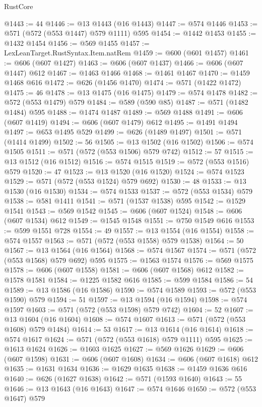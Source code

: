\begin{lexlean}{RustCore}
\begin{coremodule}
@1443 := 44
@1446 := @13 @1443 (@16 @1443)
@1447 := @574 @1446
@1453 := @571 (@572 (@553 @1447) @579 @1111) @595
@1454 := @1442 @1453
@1455 := @1432 @1454
@1456 := @569 @1455
@1457 := LexLeanTarget.RustSyntax.Item.natRem
@1459 := @600 (@601 @1457)
@1461 := @606 (@607 @1427)
@1463 := @606 (@607 @1437)
@1466 := @606 (@607 @1447) @612
@1467 := @1463 @1466
@1468 := @1461 @1467
@1470 := @1459 @1468 @616
@1472 := @626 (@1456 @1470)
@1474 := @571 (@1422 @1472)
@1475 := 46
@1478 := @13 @1475 (@16 @1475)
@1479 := @574 @1478
@1482 := @572 (@553 @1479) @579
@1484 := @589 (@590 @85)
@1487 := @571 (@1482 @1484) @595
@1488 := @1474 @1487
@1489 := @569 @1488
@1491 := @606 (@607 @1419)
@1494 := @606 (@607 @1479) @612
@1495 := @1491 @1494
@1497 := @653 @1495 @529
@1499 := @626 (@1489 @1497)
@1501 := @571 (@1414 @1499)
@1502 := 56
@1505 := @13 @1502 (@16 @1502)
@1506 := @574 @1505
@1511 := @571 (@572 (@553 @1506) @579 @742)
@1512 := 57
@1515 := @13 @1512 (@16 @1512)
@1516 := @574 @1515
@1519 := @572 (@553 @1516) @579
@1520 := 47
@1523 := @13 @1520 (@16 @1520)
@1524 := @574 @1523
@1529 := @571 (@572 (@553 @1524) @579 @692)
@1530 := 48
@1533 := @13 @1530 (@16 @1530)
@1534 := @574 @1533
@1537 := @572 (@553 @1534) @579
@1538 := @581 @1411
@1541 := @571 (@1537 @1538) @595
@1542 := @1529 @1541
@1543 := @569 @1542
@1545 := @606 (@607 @1524)
@1548 := @606 (@607 @1534) @612
@1549 := @1545 @1548
@1551 := @750 @1549 @616
@1553 := @599 @1551 @728
@1554 := 49
@1557 := @13 @1554 (@16 @1554)
@1558 := @574 @1557
@1563 := @571 (@572 (@553 @1558) @579 @1538)
@1564 := 50
@1567 := @13 @1564 (@16 @1564)
@1568 := @574 @1567
@1574 := @571 (@572 (@553 @1568) @579 @692) @595
@1575 := @1563 @1574
@1576 := @569 @1575
@1578 := @606 (@607 @1558)
@1581 := @606 (@607 @1568) @612
@1582 := @1578 @1581
@1584 := @1225 @1582 @616
@1585 := @599 @1584
@1586 := 54
@1589 := @13 @1586 (@16 @1586)
@1590 := @574 @1589
@1593 := @572 (@553 @1590) @579
@1594 := 51
@1597 := @13 @1594 (@16 @1594)
@1598 := @574 @1597
@1603 := @571 (@572 (@553 @1598) @579 @742)
@1604 := 52
@1607 := @13 @1604 (@16 @1604)
@1608 := @574 @1607
@1613 := @571 (@572 (@553 @1608) @579 @1484)
@1614 := 53
@1617 := @13 @1614 (@16 @1614)
@1618 := @574 @1617
@1624 := @571 (@572 (@553 @1618) @579 @1111) @595
@1625 := @1613 @1624
@1626 := @1603 @1625
@1627 := @569 @1626
@1629 := @606 (@607 @1598)
@1631 := @606 (@607 @1608)
@1634 := @606 (@607 @1618) @612
@1635 := @1631 @1634
@1636 := @1629 @1635
@1638 := @1459 @1636 @616
@1640 := @626 (@1627 @1638)
@1642 := @571 (@1593 @1640)
@1643 := 55
@1646 := @13 @1643 (@16 @1643)
@1647 := @574 @1646
@1650 := @572 (@553 @1647) @579

\end{coremodule}
\end{lexlean}

